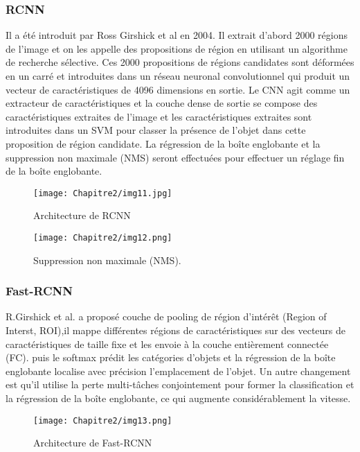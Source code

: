      \subsubsection{RCNN} \cite{rcnn_paper}
     Il a été introduit par Ross Girshick et al en 2004. Il extrait d'abord 2000 régions de l'image et on les appelle des propositions de région en utilisant un algorithme de recherche sélective. Ces 2000 propositions de régions candidates sont déformées en un carré et introduites dans un réseau neuronal convolutionnel qui produit un vecteur de caractéristiques de 4096 dimensions en sortie. Le CNN agit comme un extracteur de caractéristiques et la couche dense de sortie se compose des caractéristiques extraites de l'image et les caractéristiques extraites sont introduites dans un SVM pour classer la présence de l'objet dans cette proposition de région candidate. La régression de la boîte englobante et la suppression non maximale (NMS) seront effectuées pour effectuer un réglage fin de la boîte englobante.
     \begin{figure}[H]
          \centering
          \texttt{[image: Chapitre2/img11.jpg]}
          \caption{Architecture de RCNN}
          \label{img11}
          \end{figure}
     \begin{figure}[H]
          \centering
          \texttt{[image: Chapitre2/img12.png]}
          \caption{Suppression non maximale (NMS).}
          \label{img12}
          \end{figure}

     \subsubsection{Fast-RCNN} \cite{fast_rcnn_paper}
     R.Girshick et al. a proposé couche de pooling de région d'intérêt (Region of Interst, ROI),il mappe différentes régions de caractéristiques sur des vecteurs de caractéristiques de taille fixe et les envoie à la couche entièrement connectée (FC). puis le softmax prédit les catégories d'objets et la régression de la boîte englobante localise avec précision l'emplacement de l'objet. Un autre changement est qu'il utilise la perte multi-tâches conjointement pour former la classification et la régression de la boîte englobante, ce qui augmente considérablement la vitesse.
     \begin{figure}[H]
          \centering
          \texttt{[image: Chapitre2/img13.png]}
          \caption{Architecture de Fast-RCNN}
          \label{img13}
          \end{figure}

